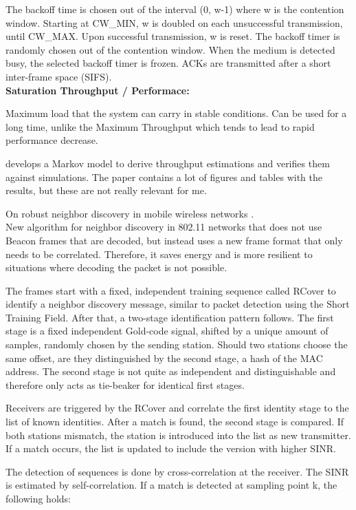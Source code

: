 The backoff time is chosen out of the interval (0, w-1) where w is the contention window. Starting at CW\_MIN, w is doubled on each unsuccessful transmission, until CW\_MAX. Upon successful transmission, w is reset. The backoff timer is randomly chosen out of the contention window. When the medium is detected busy, the selected backoff timer is frozen. ACKs are transmitted after a short inter-frame space (SIFS).\\

\textbf{Saturation Throughput / Performace:}

Maximum load that the system can carry in stable conditions. Can be used for a long time, unlike the Maximum Throughput which tends to lead to rapid performance decrease.

\cite{bianchi2000} develops a Markov model to derive throughput estimations and verifies them against simulations. The paper contains a lot of figures and tables with the results, but these are not really relevant for me.

On robust neighbor discovery in mobile wireless networks \cite{meng2015}.\\

New algorithm for neighbor discovery in 802.11 networks that does not use Beacon frames that are decoded, but instead uses a new frame format that only needs to be correlated. Therefore, it saves energy and is more resilient to situations where decoding the packet is not possible.

The frames start with a fixed, independent training sequence called RCover to identify a neighbor discovery message, similar to packet detection using the Short Training Field. After that, a two-stage identification pattern follows. The first stage is a fixed independent Gold-code signal, shifted by a unique amount of samples, randomly chosen by the sending station. Should two stations choose the same offset, are they distinguished by the second stage, a hash of the MAC address. The second stage is not quite as independent and distinguishable and therefore only acts as tie-beaker for identical first stages.

Receivers are triggered by the RCover and correlate the first identity stage to the list of known identities. After a match is found, the second stage is compared. If both stations mismatch, the station is introduced into the list as new transmitter. If a match occurs, the list is updated to include the version with higher SINR.

The detection of sequences is done by cross-correlation at the receiver. The SINR is estimated by self-correlation. If a match is detected at sampling point k, the following holds:

